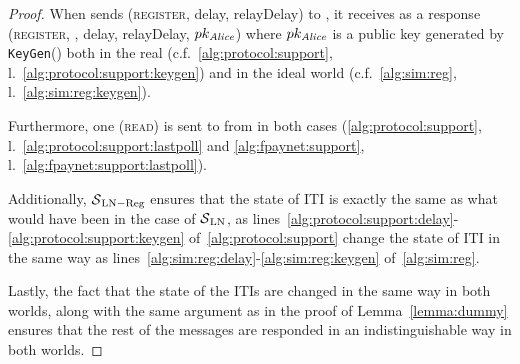 \begin{proof}
  When \environment{} sends (\textsc{register}, delay, relayDelay) to \alice{},
  it receives as a response (\textsc{register}, \alice, delay, relayDelay,
  $pk_{\mathit{Alice}}$) where $pk_{\mathit{Alice}}$ is a public key generated by
  \texttt{KeyGen}() both in the real (c.f.~\ref{alg:protocol:support},
  l.~\ref{alg:protocol:support:keygen}) and in the ideal world
  (c.f.~\ref{alg:sim:reg}, l.~\ref{alg:sim:reg:keygen}).

  Furthermore, one (\textsc{read}) is sent to \ledger{} from \alice{} in both
  cases (\ref{alg:protocol:support}, l.~\ref{alg:protocol:support:lastpoll} and
  \ref{alg:fpaynet:support}, l.~\ref{alg:fpaynet:support:lastpoll}).

  Additionally, $\mathcal{S}{}_{\mathrm{LN - Reg}}$ ensures that the state of
  \alice{} ITI is exactly the same as what would have been in the case of
  $\mathcal{S}{}_{\mathrm{LN}}$, as
  lines~\ref{alg:protocol:support:delay}-\ref{alg:protocol:support:keygen}
  of~\ref{alg:protocol:support} change the state of \alice{} ITI in the same way
  as lines~\ref{alg:sim:reg:delay}-\ref{alg:sim:reg:keygen}
  of~\ref{alg:sim:reg}.

  Lastly, the fact that the state of the \alice{} ITIs are changed in the same
  way in both worlds, along with the same argument as in the proof of
  Lemma~\ref{lemma:dummy} ensures that the rest of the messages are responded in
  an indistinguishable way in both worlds.
\end{proof}
